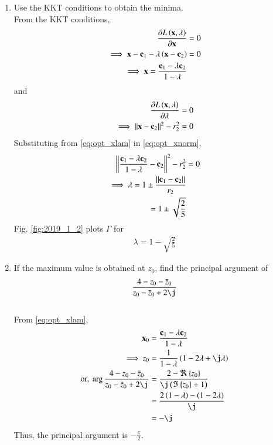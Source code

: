 \documentclass[journal,12pt,twocolumn]{IEEEtran}
\renewcommand\thesection{\arabic{section}}
\begin{document}
\begin{enumerate}[label=\thesection.\arabic*
,ref=\thesection.\theenumi]
\item Use the KKT conditions to obtain the minima.
\\
\solution
From the KKT conditions, 
\begin{align}
\frac{\partial L \left(\mathbf{x},\lambda\right)}{\partial \mathbf{x}} &= 0
\\
\implies {\mathbf{x} - \mathbf{c}_1} - \lambda \left(\mathbf{x} - \mathbf{c}_2\right) &= 0
\\
\implies \mathbf{x}  = \frac{\mathbf{c}_1 -\lambda  \mathbf{c}_2}{1-\lambda } &
\label{eq:opt_xlam}
\end{align}
%
and 
\begin{align}
\frac{\partial L \left(\mathbf{x},\lambda\right)}{\partial \lambda} &= 0
\\
\implies \left\Vert\mathbf{x} - \mathbf{c}_2\right\Vert^2-r_2^2 &= 0
\label{eq:opt_xnorm}
\end{align}
Substituting from \eqref{eq:opt_xlam} in \eqref{eq:opt_xnorm},
\begin{align}
\left\Vert\frac{\mathbf{c}_1 -\lambda  \mathbf{c}_2}{1-\lambda } - \mathbf{c}_2\right\Vert^2-r_2^2 &= 0
\\
\implies \lambda = 1\pm \frac{\left\Vert\mathbf{c}_1 - \mathbf{c}_2\right\Vert}{r_2}&
\\
= 1 \pm \sqrt{\frac{2}{5}}
\end{align}
Fig. \ref{fig:2019_1_2} plots $\Gamma$ for 
\begin{align}
\lambda = 1 - \sqrt{\frac{2}{5}}
\end{align}
\item If the maximum value is obtained at $z_0$, find the principal argument of
\begin{align}
\frac{4 - z_0-\bar{z}_0}{z_0-\bar{z}_0+2\j}
\end{align}
\\
\solution 
From \eqref{eq:opt_xlam},
\begin{align}
 \vec{x}_0  &= \frac{\vec{c}_1 -\lambda  \vec{c}_2}{1-\lambda } 
\\
\implies z_0 &= \frac{1}{1-\lambda}\brak{1-2\lambda + \j \lambda }
\\
\text{or, }\arg \frac{4 - z_0-\bar{z}_0}{z_0-\bar{z}_0+2\j} &= \frac{2 - \Re\cbrak{z_0}}{\j\brak{\Im\cbrak{z_0}+1}}
\\
&=\frac{2\brak{1-\lambda}-\brak{1-2\lambda}}{\j} 
\\
&= -\j
\end{align}
%
Thus, the principal argument is $-\frac{\pi}{2}$.
\begin{figure}[!ht]
\centering

\end{figure}
\end{enumerate}
\end{document}
